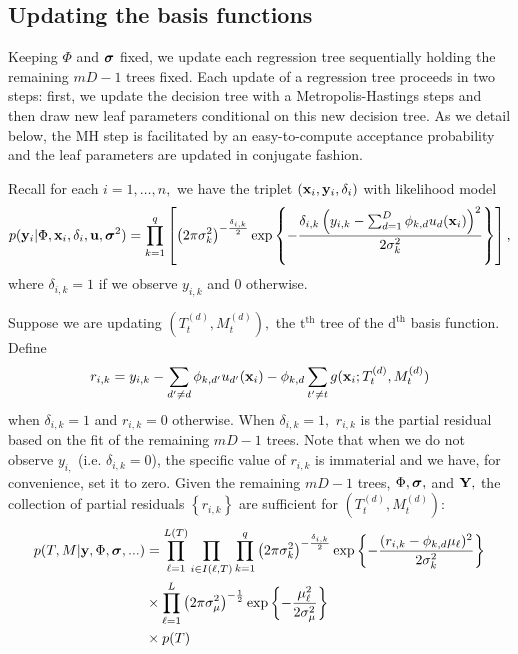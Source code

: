 \documentclass[12pt]{article}
\begin{document}
\subsection{Updating the basis functions}

Keeping $\Phi$ and $\boldsymbol{\sigma}$ fixed, we update each regression tree sequentially holding the remaining $mD - 1$ trees fixed.
Each update of a regression tree proceeds in two steps: first, we update the decision tree with a Metropolis-Hastings steps and then draw new leaf parameters conditional on this new decision tree.
As we detail below, the MH step is facilitated by an easy-to-compute acceptance probability and the leaf parameters are updated in conjugate fashion.

Recall for each $i = 1, \ldots, n,$ we have the triplet $(\mathbf{x}_{i}, \mathbf{y}_{i}, \delta_{i})$ with likelihood model
$$
p(\mathbf{y}_{i} | \Phi, \mathbf{x}_{i}, \delta_{i}, \mathbf{u}, \boldsymbol{\sigma}^{2}) = \prod_{k = 1}^{q}\left[\left(2\pi\sigma^{2}_{k}\right)^{-\frac{\delta_{i,k}}{2}}\exp\left\{-\frac{\delta_{i,k}\left(y_{i,k} - \sum_{d = 1}^{D}{\phi_{k,d}u_{d}(\mathbf{x}_{i})}\right)^{2}}{2\sigma^{2}_{k}}\right\}\right],
$$
where $\delta_{i,k} = 1$ if we observe $y_{i,k}$ and 0 otherwise.

Suppose we are updating $(T^{(d)}_{t}, M^{(d)}_{t}),$ the $\text{t}^{\text{th}}$ tree of the $\text{d}^{\text{th}}$ basis function.
Define
$$
r_{i,k} = y_{i,k} - \sum_{d' \neq d}{\phi_{k,d'}u_{d'}(\mathbf{x}_{i})} - \phi_{k,d}\sum_{t' \neq t}{g(\mathbf{x}_{i}; T_{t}^{(d)}, M_{t}^{(d)})}
$$
when $\delta_{i,k} = 1$ and $r_{i,k} = 0$ otherwise.
When $\delta_{i,k} = 1,$ $r_{i,k}$ is the partial residual based on the fit of the remaining $mD - 1$ trees.
Note that when we do not observe $y_{i,}$ (i.e. $\delta_{i,k} = 0$), the specific value of $r_{i,k}$ is immaterial and we have, for convenience, set it to zero. 
Given the remaining $mD - 1$ trees, $\Phi, \boldsymbol{\sigma},$ and $\mathbf{Y},$ the collection of partial residuals $\left\{r_{i,k}\right\}$ are sufficient for $(T^{(d)}_{t}, M^{(d)}_{t})$:
\begin{align*}
p(T,M | \mathbf{y}, \Phi, \boldsymbol{\sigma}, ... ) &= \prod_{\ell = 1}^{L(T)}\prod_{i \in I(\ell,T)}\prod_{k = 1}^{q}{\left(2\pi\sigma^{2}_{k}\right)^{-\frac{\delta_{i,k}}{2}}\exp\left\{-\frac{(r_{i,k} - \phi_{k,d}\mu_{\ell})^{2}}{2\sigma^{2}_{k}}\right\}} \\
&\times \prod_{\ell = 1}^{L}{\left(2\pi\sigma^{2}_{\mu}\right)^{-\frac{1}{2}}\exp\left\{-\frac{\mu_{\ell}^{2}}{2\sigma^{2}_{\mu}}\right\}} \\
&\times p(T)
\end{align*}
\end{document}
